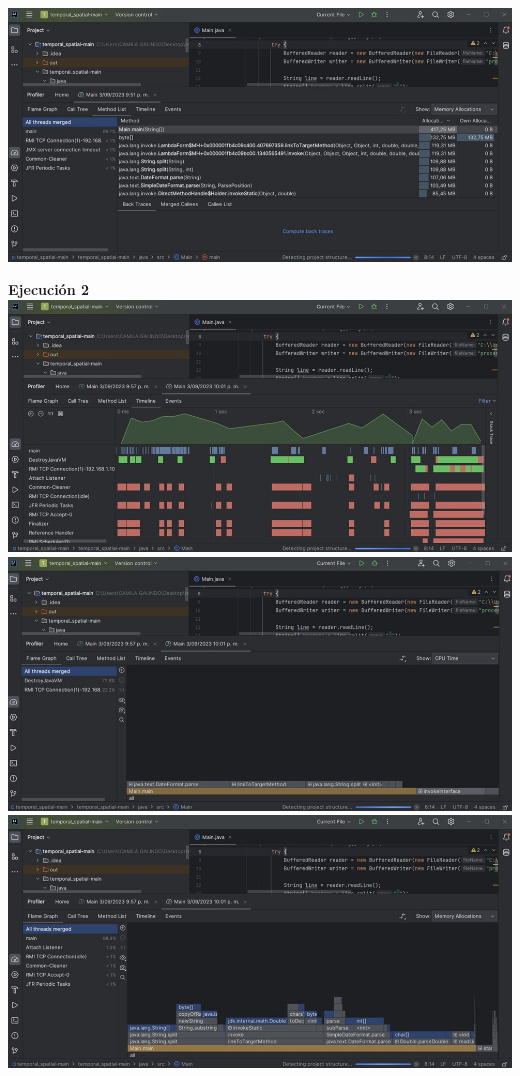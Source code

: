 \documentclass[a4paper,twocolumn,10pt]{article}
\begin{document}
\includegraphics[width=0.9\linewidth]{Lenovo AMD 3020e/Method List Memory Allocation 1.jpeg}

\textbf{Ejecución 2\\}
\includegraphics[width=0.9\linewidth]{Lenovo AMD 3020e/TimeLine 2.jpeg}
\includegraphics[width=0.9\linewidth]{Lenovo AMD 3020e/FlameGraph CPU Time 2.jpeg}
\includegraphics[width=0.9\linewidth]{Lenovo AMD 3020e/FlameGraph Memory Allocation 2.jpeg}
\end{document}
